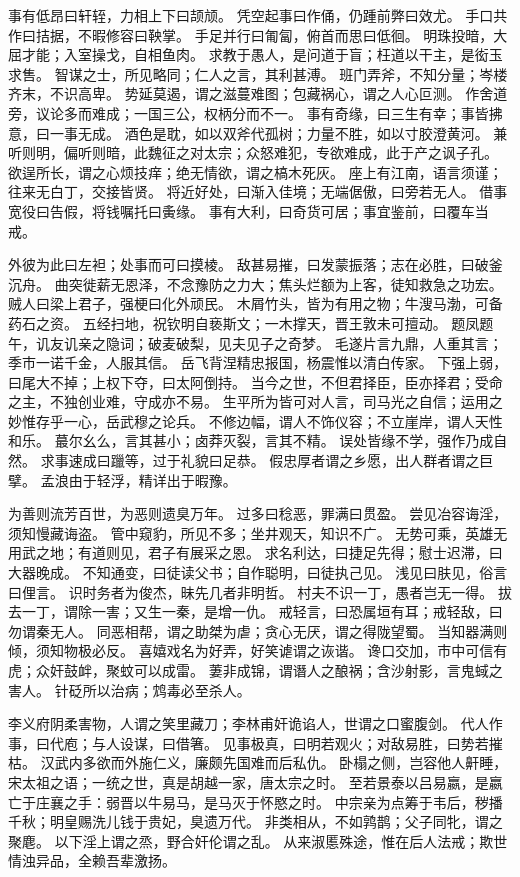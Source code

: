 \documentclass[12pt,UTF8]{ctexbook}
\begin{document}
事有低昂曰轩轾，力相上下曰颉颃。
凭空起事曰作俑，仍踵前弊曰效尤。
手口共作曰拮据，不暇修容曰鞅掌。
手足并行曰匍匐，俯首而思曰低徊。
明珠投暗，大屈才能；入室操戈，自相鱼肉。
求教于愚人，是问道于盲；枉道以干主，是衒玉求售。
智谋之士，所见略同；仁人之言，其利甚溥。
班门弄斧，不知分量；岑楼齐末，不识高卑。
势延莫遏，谓之滋蔓难图；包藏祸心，谓之人心叵测。
作舍道旁，议论多而难成；一国三公，权柄分而不一。
事有奇缘，曰三生有幸；事皆拂意，曰一事无成。
酒色是耽，如以双斧代孤树；力量不胜，如以寸胶澄黄河。
兼听则明，偏听则暗，此魏征之对太宗；众怒难犯，专欲难成，此于产之讽子孔。
欲逞所长，谓之心烦技痒；绝无情欲，谓之槁木死灰。
座上有江南，语言须谨；往来无白丁，交接皆贤。
将近好处，曰渐入佳境；无端倨傲，曰旁若无人。
借事宽役曰告假，将钱嘱托曰夤缘。
事有大利，曰奇货可居；事宜鉴前，曰覆车当戒。

外彼为此曰左袒；处事而可曰摸棱。
敌甚易摧，曰发蒙振落；志在必胜，曰破釜沉舟。
曲突徙薪无恩泽，不念豫防之力大；焦头烂额为上客，徒知救急之功宏。
贼人曰梁上君子，强梗曰化外顽民。
木屑竹头，皆为有用之物；牛溲马渤，可备药石之资。
五经扫地，祝钦明自亵斯文；一木撑天，晋王敦未可擅动。
题凤题午，讥友讥亲之隐词；破麦破梨，见夫见子之奇梦。
毛遂片言九鼎，人重其言；季市一诺千金，人服其信。
岳飞背涅精忠报国，杨震惟以清白传家。
下强上弱，曰尾大不掉；上权下夺，曰太阿倒持。
当今之世，不但君择臣，臣亦择君；受命之主，不独创业难，守成亦不易。
生平所为皆可对人言，司马光之自信；运用之妙惟存乎一心，岳武穆之论兵。
不修边幅，谓人不饰仪容；不立崖岸，谓人天性和乐。
蕞尔幺么，言其甚小；卤莽灭裂，言其不精。
误处皆缘不学，强作乃成自然。
求事速成曰躐等，过于礼貌曰足恭。
假忠厚者谓之乡愿，出人群者谓之巨擘。
孟浪由于轻浮，精详出于暇豫。

为善则流芳百世，为恶则遗臭万年。
过多曰稔恶，罪满曰贯盈。
尝见冶容诲淫，须知慢藏诲盗。
管中窥豹，所见不多；坐井观天，知识不广。
无势可乘，英雄无用武之地；有道则见，君子有展采之恩。
求名利达，曰捷足先得；慰士迟滞，曰大器晚成。
不知通变，曰徒读父书；自作聪明，曰徒执己见。
浅见曰肤见，俗言曰俚言。
识时务者为俊杰，昧先几者非明哲。
村夫不识一丁，愚者岂无一得。
拔去一丁，谓除一害；又生一秦，是增一仇。
戒轻言，曰恐属垣有耳；戒轻敌，曰勿谓秦无人。
同恶相帮，谓之助桀为虐；贪心无厌，谓之得陇望蜀。
当知器满则倾，须知物极必反。
喜嬉戏名为好弄，好笑谑谓之诙谐。
谗口交加，市中可信有虎；众奸鼓衅，聚蚊可以成雷。
萋非成锦，谓谮人之酿祸；含沙射影，言鬼蜮之害人。
针砭所以治病；鸩毒必至杀人。

李义府阴柔害物，人谓之笑里藏刀；李林甫奸诡谄人，世谓之口蜜腹剑。
代人作事，曰代庖；与人设谋，曰借箸。
见事极真，曰明若观火；对敌易胜，曰势若摧枯。
汉武内多欲而外施仁义，廉颇先国难而后私仇。
卧榻之侧，岂容他人鼾睡，宋太祖之语；一统之世，真是胡越一家，唐太宗之时。
至若景泰以吕易嬴，是嬴亡于庄襄之手：弱晋以牛易马，是马灭于怀愍之时。
中宗亲为点筹于韦后，秽播千秋；明皇赐洗儿钱于贵妃，臭遗万代。
非类相从，不如鹑鹊；父子同牝，谓之聚麀。
以下淫上谓之烝，野合奸伦谓之乱。
从来淑慝殊途，惟在后人法戒；欺世情浊异品，全赖吾辈激扬。
\end{document}
